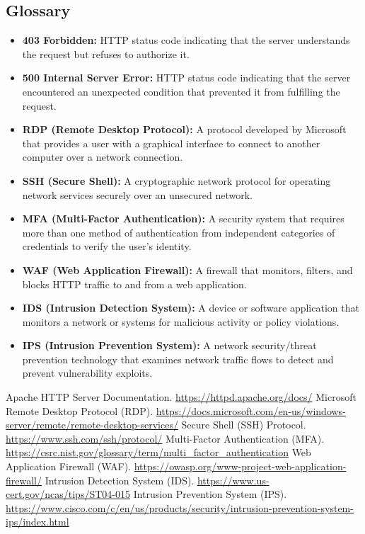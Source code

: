 \documentclass[11pt]{article}
\begin{document}
\subsection{Glossary}
\begin{itemize}
    \item \textbf{403 Forbidden:} HTTP status code indicating that the server understands the request but refuses to authorize it.
    \item \textbf{500 Internal Server Error:} HTTP status code indicating that the server encountered an unexpected condition that prevented it from fulfilling the request.
    \item \textbf{RDP (Remote Desktop Protocol):} A protocol developed by Microsoft that provides a user with a graphical interface to connect to another computer over a network connection.
    \item \textbf{SSH (Secure Shell):} A cryptographic network protocol for operating network services securely over an unsecured network.
    \item \textbf{MFA (Multi-Factor Authentication):} A security system that requires more than one method of authentication from independent categories of credentials to verify the user's identity.
    \item \textbf{WAF (Web Application Firewall):} A firewall that monitors, filters, and blocks HTTP traffic to and from a web application.
    \item \textbf{IDS (Intrusion Detection System):} A device or software application that monitors a network or systems for malicious activity or policy violations.
    \item \textbf{IPS (Intrusion Prevention System):} A network security/threat prevention technology that examines network traffic flows to detect and prevent vulnerability exploits.
\end{itemize}

\clearpage
\begin{thebibliography}{}
     Apache HTTP Server Documentation. \url{https://httpd.apache.org/docs/}
     Microsoft Remote Desktop Protocol (RDP). \url{https://docs.microsoft.com/en-us/windows-server/remote/remote-desktop-services/}
     Secure Shell (SSH) Protocol. \url{https://www.ssh.com/ssh/protocol/}
     Multi-Factor Authentication (MFA). \url{https://csrc.nist.gov/glossary/term/multi_factor_authentication}
     Web Application Firewall (WAF). \url{https://owasp.org/www-project-web-application-firewall/}
     Intrusion Detection System (IDS). \url{https://www.us-cert.gov/ncas/tips/ST04-015}
     Intrusion Prevention System (IPS). \url{https://www.cisco.com/c/en/us/products/security/intrusion-prevention-system-ips/index.html}
\end{thebibliography}
\end{document}
